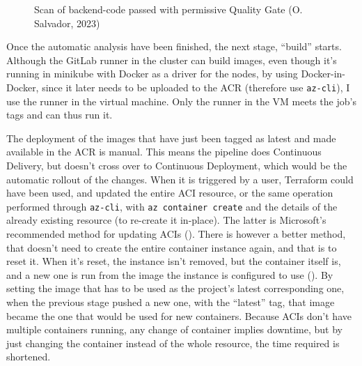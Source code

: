 \documentclass[11pt]{article}
\begin{document}
\begin{flushleft}
        \begin{figure}[htb]
            \centering
            \caption{Scan of backend-code passed with permissive Quality Gate (O. Salvador, 2023)}
        \end{figure}

    Once the automatic analysis have been finished, the next stage, ``build'' starts. Although the GitLab runner in the cluster can build images, even though it's running in minikube with Docker as a driver for the nodes, by using Docker-in-Docker, since it later needs to be uploaded to the ACR (therefore use \texttt{az-cli}), I use the runner in the virtual machine. Only the runner in the VM meets the job's tags and can thus run it. 
    \linebreak

    The deployment of the images that have just been tagged as latest and made available in the ACR is manual. This means the pipeline does Continuous Delivery, but doesn't cross over to Continuous Deployment, which would be the automatic rollout of the changes. When it is triggered by a user, Terraform could have been used, and updated the entire ACI resource, or the same operation performed through \texttt{az-cli}, with \texttt{az container create} and the details of the already existing resource (to re-create it in-place). The latter is Microsoft's recommended method for updating ACIs (\cite{updateaci}). There is however a better method, that doesn't need to create the entire container instance again, and that is to reset it. When it's reset, the instance isn't removed, but the container itself is, and a new one is run from the image the instance is configured to use (\cite{aciaz}). By setting the image that has to be used as the project's latest corresponding one, when the previous stage pushed a new one, with the ``latest'' tag, that image became the one that would be used for new containers. Because ACIs don't have multiple containers running, any change of container implies downtime, but by just changing the container instead of the whole resource, the time required is shortened.
    \linebreak
            

\end{flushleft}
\end{document}
